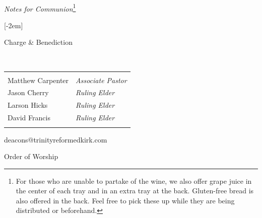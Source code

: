 
\usepackage{framed}
\usepackage{enumitem}

    \pagestyle{empty}
    \raggedright
    \setlength{\parindent}{0pt}
    \setlength{\parskip}{1em}
    \setlength{\marginparwidth}{2em}

	
  \vspace{.3in}

   \\
	\hspace{3mm}\textit{Notes for Communion}\footnote{For those who are unable to partake of the wine, we also offer grape juice in the center of each tray and in an extra tray at the back. Gluten-free bread is also offered in the back. Feel free to pick these up while they are being distributed or beforehand.}

	\hymnsix

	\hymnseven

  \hymnDoxology {}[-2em]

	\vspace{1.5\baselineskip}


	Charge \& Benediction

	\benediction

  \vfill{

  \begin{center}
	 \\
  \begin{tabular}{ll}
    & \\
  Matthew Carpenter & \textit{Associate Pastor} \\
  Jason Cherry & \textit{Ruling Elder}\\
  Larson Hicks & \textit{Ruling Elder}\\
  David Francis & \textit{Ruling Elder}\\
    &  \\
  \end{tabular}
  deacons@trinityreformedkirk.com
  \end{center}
}


  \newpage

	\begin{center}
		\LARGE
		\null \vspace{.5in}
		Order of Worship

		\Large \coverdate
	\end{center}

